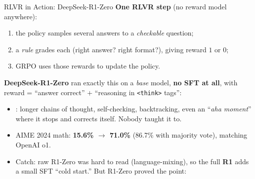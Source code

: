 \begin{frame}{RLVR in Action: DeepSeek-R1-Zero}
\textbf{One RLVR step} (no reward model anywhere):
\begin{enumerate}\itemsep0.1em\small
    \item the policy samples several answers to a \emph{checkable} question;
    \item a \emph{rule} grades each (right answer? right format?), giving reward
          $1$ or $0$;
    \item GRPO uses those rewards to update the policy. 
\end{enumerate}
\vspace{0.3em}
\textbf{DeepSeek-R1-Zero} ran exactly this on a \emph{base} model, \textbf{no SFT
at all}, with reward = ``answer correct'' $+$ ``reasoning in \texttt{<think>}
tags'':
\begin{itemize}\itemsep0.1em\small
    \item {}: longer chains of thought,
          self-checking, backtracking, even an ``\emph{aha moment}'' where it stops
          and corrects itself. Nobody taught it to.
    \item AIME 2024 math: \textbf{15.6\% $\to$ 71.0\%} (86.7\% with majority vote), matching OpenAI o1.
    \item Catch: raw R1-Zero was hard to read (language-mixing), so the full
          \textbf{R1} adds a small SFT ``cold start.'' But R1-Zero proved the point:
\end{itemize}
\end{frame}
